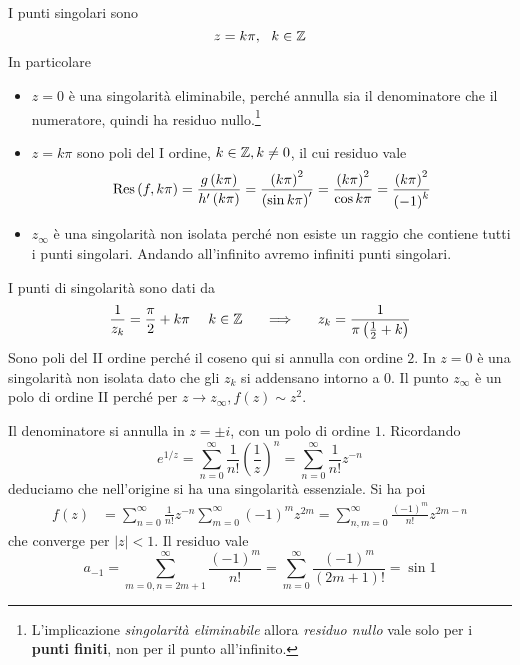 I punti singolari sono
\begin{equation*}
z = k\pi ,\ \ k\in \ZZ 
\end{equation*}
In particolare
\begin{itemize}
\item $z = 0$ è una singolarità eliminabile, perché annulla sia il denominatore che il numeratore, quindi ha residuo nullo.\footnote{L'implicazione \textit{singolarità eliminabile} allora \textit{residuo nullo} vale solo per i \textbf{punti finiti}, non per il punto all'infinito.}
\item $z = k\pi $ sono poli del I ordine, $k\in \mathbb{Z}  ,k\neq 0$, il cui residuo vale
\begin{equation*}
\operatorname{Res} \left(f,k\pi \right) = \frac{g\left(k\pi \right)}{h'\left(k\pi \right)} = \frac{\left(k\pi \right)^{2}}{\left(\sin k\pi \right) '} = \frac{\left(k\pi \right)^{2}}{\cos k\pi } = \frac{\left(k\pi \right)^{2}}{\left(- 1\right)^{k}}
\end{equation*}
\item $z_{\infty }$ è una singolarità non isolata perché non esiste un raggio che contiene tutti i punti singolari. Andando all'infinito avremo infiniti punti singolari.
\end{itemize}
\Soluzione

I punti di singolarità sono dati da
\begin{equation*}
\frac{1}{z_{k}} = \frac{\pi }{2} + k\pi \ \ \ \ k\in \ZZ  \ \ \ \ \implies \ \ \ \ z_{k} = \frac{1}{\pi \left(\frac{1}{2} + k\right)}
\end{equation*}
Sono poli del II ordine perché il coseno qui si annulla con ordine $2$. In $z = 0$ è una singolarità non isolata dato che gli $z_{k}$ si addensano intorno a $0$. Il punto $z_{\infty }$ è un polo di ordine II perché per $z\rightarrow z_{\infty } ,f\left(z\right) \sim z^{2}$.
\Soluzione

Il denominatore si annulla in $z = \pm i$, con un polo di ordine $1$. Ricordando
\begin{equation*}
e^{1/z} = \sum\limits ^{\infty }_{n = 0}\frac{1}{n!}\left(\frac{1}{z}\right)^{n} = \sum\limits ^{\infty }_{n = 0}\frac{1}{n!} z^{ - n}
\end{equation*}
deduciamo che nell'origine si ha una singolarità essenziale. Si ha poi
\begin{align*}
f\left(z\right) & = \sum\limits ^{\infty }_{n = 0}\frac{1}{n!} z^{ - n}\sum\limits ^{\infty }_{m = 0}\left(- 1\right)^{m} z^{2m} = \sum\limits ^{\infty }_{n,m = 0}\frac{\left(- 1\right)^{m}}{n!} z^{2m - n}
\end{align*}
che converge per $\left| z\right| < 1$. Il residuo vale
\begin{equation*}
a_{ - 1} = \sum\limits ^{\infty }_{m = 0,n = 2m + 1}\frac{\left(- 1\right)^{m}}{n!} = \sum\limits ^{\infty }_{m = 0}\frac{\left(- 1\right)^{m}}{\left(2m + 1\right) !} = \sin 1
\end{equation*}
\Soluzione

